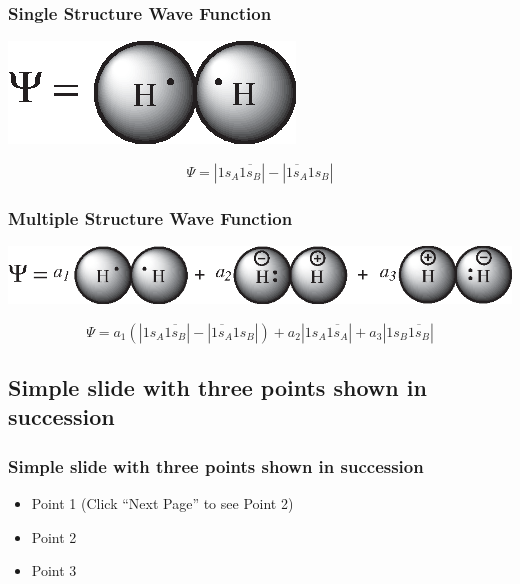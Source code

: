 \documentclass[]{beamer}
\begin{document}
\begin{frame}
  \frametitle{Single Structure Wave Function}
  \begin{center}
    \includegraphics{../figures/heitler.eps}  
  \end{center}
  \begin{equation*}
    \Psi = |1s_{A}\overline{1s_{B}}| - |\overline{1s_{A}}1s_{B}|
  \end{equation*}
\end{frame}

\begin{frame}
  \frametitle{Multiple Structure Wave Function}
  \begin{center}
    \includegraphics{../figures/heitlerplus.eps}
  \end{center}
  \begin{equation*}
    \Psi=a_1(|1s_{A}\overline{1s_{B}}| - |\overline{1s_{A}}1s_{B}|) + a_2 |1s_{A}\overline{1s_{A}}| + a_3 |1s_{B}\overline{1s_{B}}|
  \end{equation*}
\end{frame}

\subsection{Simple slide with three points shown in succession}

\begin{frame}
  \frametitle{Simple slide with three points shown in succession}   %

  \begin{itemize}
  \item<1-> Point 1 (Click ``Next Page'' to see Point 2) %
  \item<2-> Point 2  %
  \item<3-> Point 3
  \end{itemize}
\end{frame}
\end{document}
